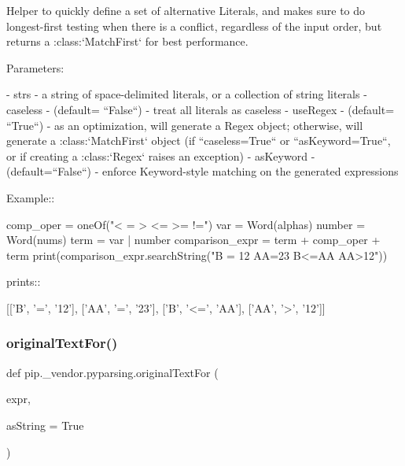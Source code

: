 \begin{DoxyVerb}Helper to quickly define a set of alternative Literals, and makes
sure to do longest-first testing when there is a conflict,
regardless of the input order, but returns
a :class:`MatchFirst` for best performance.

Parameters:

 - strs - a string of space-delimited literals, or a collection of
   string literals
 - caseless - (default= ``False``) - treat all literals as
   caseless
 - useRegex - (default= ``True``) - as an optimization, will
   generate a Regex object; otherwise, will generate
   a :class:`MatchFirst` object (if ``caseless=True`` or ``asKeyword=True``, or if
   creating a :class:`Regex` raises an exception)
 - asKeyword - (default=``False``) - enforce Keyword-style matching on the
   generated expressions

Example::

    comp_oper = oneOf("< = > <= >= !=")
    var = Word(alphas)
    number = Word(nums)
    term = var | number
    comparison_expr = term + comp_oper + term
    print(comparison_expr.searchString("B = 12  AA=23 B<=AA AA>12"))

prints::

    [['B', '=', '12'], ['AA', '=', '23'], ['B', '<=', 'AA'], ['AA', '>', '12']]
\end{DoxyVerb}
 \mbox{\label{namespacepip_1_1__vendor_1_1pyparsing_ac65e1285d71fa054708a263df195611f}} 
\subsubsection{\texorpdfstring{original\+Text\+For()}{originalTextFor()}}
{\footnotesize\ttfamily def pip.\+\_\+vendor.\+pyparsing.\+original\+Text\+For (\begin{DoxyParamCaption}\item[{}]{expr,  }\item[{}]{as\+String = {\ttfamily True} }\end{DoxyParamCaption})}

